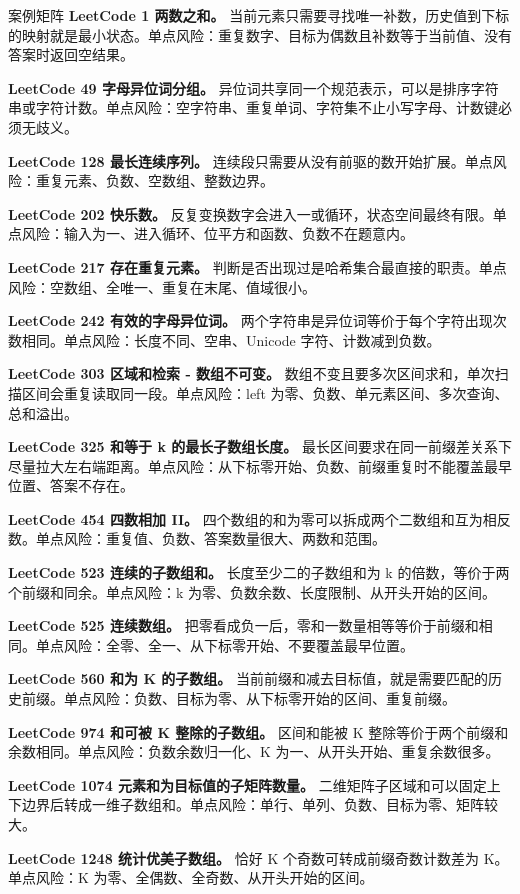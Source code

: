\begin{principlebox}{案例矩阵}
\textbf{LeetCode 1 两数之和。}
当前元素只需要寻找唯一补数，历史值到下标的映射就是最小状态。单点风险：重复数字、目标为偶数且补数等于当前值、没有答案时返回空结果。

\textbf{LeetCode 49 字母异位词分组。}
异位词共享同一个规范表示，可以是排序字符串或字符计数。单点风险：空字符串、重复单词、字符集不止小写字母、计数键必须无歧义。

\textbf{LeetCode 128 最长连续序列。}
连续段只需要从没有前驱的数开始扩展。单点风险：重复元素、负数、空数组、整数边界。

\textbf{LeetCode 202 快乐数。}
反复变换数字会进入一或循环，状态空间最终有限。单点风险：输入为一、进入循环、位平方和函数、负数不在题意内。

\textbf{LeetCode 217 存在重复元素。}
判断是否出现过是哈希集合最直接的职责。单点风险：空数组、全唯一、重复在末尾、值域很小。

\textbf{LeetCode 242 有效的字母异位词。}
两个字符串是异位词等价于每个字符出现次数相同。单点风险：长度不同、空串、Unicode 字符、计数减到负数。

\textbf{LeetCode 303 区域和检索 - 数组不可变。}
数组不变且要多次区间求和，单次扫描区间会重复读取同一段。单点风险：left 为零、负数、单元素区间、多次查询、总和溢出。

\textbf{LeetCode 325 和等于 k 的最长子数组长度。}
最长区间要求在同一前缀差关系下尽量拉大左右端距离。单点风险：从下标零开始、负数、前缀重复时不能覆盖最早位置、答案不存在。

\textbf{LeetCode 454 四数相加 II。}
四个数组的和为零可以拆成两个二数组和互为相反数。单点风险：重复值、负数、答案数量很大、两数和范围。

\textbf{LeetCode 523 连续的子数组和。}
长度至少二的子数组和为 k 的倍数，等价于两个前缀和同余。单点风险：k 为零、负数余数、长度限制、从开头开始的区间。

\textbf{LeetCode 525 连续数组。}
把零看成负一后，零和一数量相等等价于前缀和相同。单点风险：全零、全一、从下标零开始、不要覆盖最早位置。

\textbf{LeetCode 560 和为 K 的子数组。}
当前前缀和减去目标值，就是需要匹配的历史前缀。单点风险：负数、目标为零、从下标零开始的区间、重复前缀。

\textbf{LeetCode 974 和可被 K 整除的子数组。}
区间和能被 K 整除等价于两个前缀和余数相同。单点风险：负数余数归一化、K 为一、从开头开始、重复余数很多。

\textbf{LeetCode 1074 元素和为目标值的子矩阵数量。}
二维矩阵子区域和可以固定上下边界后转成一维子数组和。单点风险：单行、单列、负数、目标为零、矩阵较大。

\textbf{LeetCode 1248 统计优美子数组。}
恰好 K 个奇数可转成前缀奇数计数差为 K。单点风险：K 为零、全偶数、全奇数、从开头开始的区间。

\end{principlebox}

